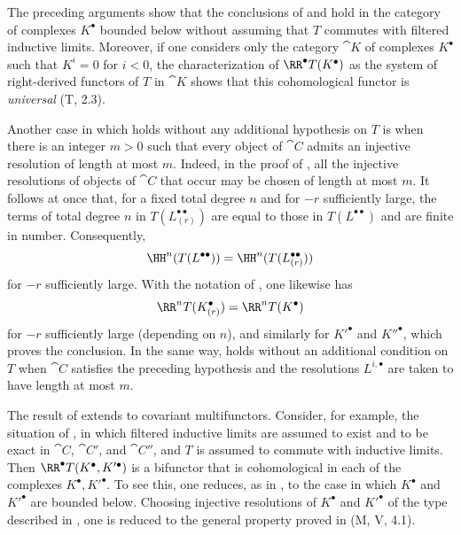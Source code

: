 \begin{remark}[11.5.4]
\label{0.11.5.4}
The preceding arguments show that the conclusions of  and  hold in the category of complexes $K^\bullet$ bounded below without assuming that $T$ commutes with filtered inductive limits.
Moreover, if one considers only the category $\cat{K}$ of complexes $K^\bullet$ such that $K^i=0$ for $i<0$, the characterization of $\RR^\bullet T(K^\bullet)$ as the system of right-derived functors of $T$ in $\cat{K}$ shows that this cohomological functor is \emph{universal} (T, 2.3).

Another case in which  holds without any additional hypothesis on $T$ is when there is an integer $m>0$ such that every object of $\cat{C}$ admits an injective resolution of length at most $m$.
Indeed, in the proof of , all the injective resolutions of objects of $\cat{C}$ that occur may be chosen of length at most $m$.
It follows at once that, for a fixed total degree $n$ and for $-r$ sufficiently large, the terms of total degree $n$ in $T(L^{\bullet\bullet}_{(r)})$ are equal to those in $T(L^{\bullet\bullet})$ and are finite in number.
Consequently,
\[
  \HH^n(T(L^{\bullet\bullet}))
  =\HH^n(T(L^{\bullet\bullet}_{(r)}))
\]
for $-r$ sufficiently large.
With the notation of , one likewise has
\[
  \RR^nT(K^\bullet_{(r)})=\RR^nT(K^\bullet)
\]
for $-r$ sufficiently large (depending on $n$), and similarly for $K'^\bullet$ and $K''^\bullet$, which proves the conclusion.
In the same way,  holds without an additional condition on $T$ when $\cat{C}$ satisfies the preceding hypothesis and the resolutions $L^{i,\bullet}$ are taken to have length at most $m$.
\end{remark}

\begin{env}[11.5.5]
\label{0.11.5.5}
The result of  extends to covariant multifunctors.
Consider, for example, the situation of , in which filtered inductive limits are assumed to exist and to be exact in $\cat{C}$, $\cat{C}'$, and $\cat{C}''$,
and $T$ is assumed to commute with inductive limits.
Then $\RR^\bullet T(K^\bullet,K'^\bullet)$ is a bifunctor that is cohomological in each of the complexes $K^\bullet,K'^\bullet$.
To see this, one reduces, as in , to the case in which $K^\bullet$ and $K'^\bullet$ are bounded below.
Choosing injective resolutions of $K^\bullet$ and $K'^\bullet$ of the type described in , one is reduced to the general property proved in (M, V, 4.1).
\end{env}

